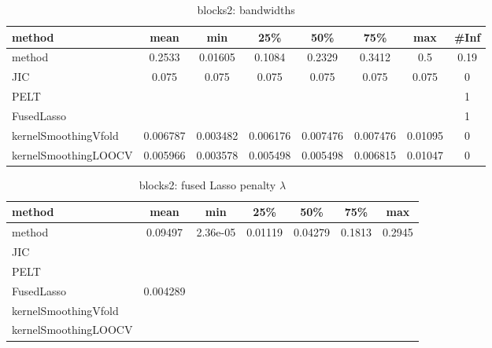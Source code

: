 \begin{table}[ht]
\centering
\begin{tabular}{l|c|ccccc|c}
  \hline
method & mean & min & 25\% & 50\% & 75\% & max & \#Inf \\ 
  \hline
method & 0.2533 & 0.01605 & 0.1084 & 0.2329 & 0.3412 &   0.5 & 0.19 \\ 
  JIC & 0.075 & 0.075 & 0.075 & 0.075 & 0.075 & 0.075 &   0 \\ 
  PELT &  &  &  &  &  &  &   1 \\ 
  FusedLasso &  &  &  &  &  &  &   1 \\ 
  kernelSmoothingVfold & 0.006787 & 0.003482 & 0.006176 & 0.007476 & 0.007476 & 0.01095 &   0 \\ 
  kernelSmoothingLOOCV & 0.005966 & 0.003578 & 0.005498 & 0.005498 & 0.006815 & 0.01047 &   0 \\ 
   \hline
\end{tabular}
\caption{blocks2: bandwidths} 
\label{tab:blocks2Bandwidths}
\end{table}
\begin{table}[ht]
\centering
\begin{tabular}{l|c|ccccc}
  \hline
method & mean & min & 25\% & 50\% & 75\% & max \\ 
  \hline
method & 0.09497 & 2.36e-05 & 0.01119 & 0.04279 & 0.1813 & 0.2945 \\ 
  JIC &  &  &  &  &  &  \\ 
  PELT &  &  &  &  &  &  \\ 
  FusedLasso & 0.004289 &  &  &  &  &  \\ 
  kernelSmoothingVfold &  &  &  &  &  &  \\ 
  kernelSmoothingLOOCV &  &  &  &  &  &  \\ 
   \hline
\end{tabular}
\caption{blocks2: fused Lasso penalty $\lambda$} 
\label{tab:blocks2Lambdas}
\end{table}
